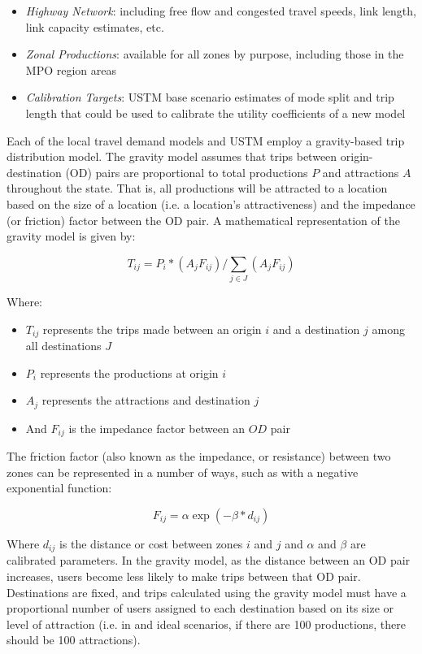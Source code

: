 \begin{itemize}
\def\labelenumi{\arabic{enumi}.}
\item
  \emph{Highway Network}: including free flow and congested travel speeds,
  link length, link capacity estimates, etc.
\item
  \emph{Zonal Productions}: available for all zones by purpose,
  including those in the MPO region areas
\item
  \emph{Calibration Targets}: USTM base scenario estimates of mode split and
  trip length that could be used to calibrate the utility coefficients of a new model
\end{itemize}

Each of the local travel demand models and USTM employ a gravity-based trip
distribution model. The gravity model assumes that trips between origin-
destination (OD) pairs are proportional to total productions $P$ and
attractions $A$ throughout the state. That is, all productions will be
attracted to a location based on the size of a location (i.e. a location's
attractiveness) and the impedance (or friction) factor between the OD
pair. A mathematical representation of the gravity model is given by:

\begin{equation}
T_{ij}= P_i*(A_j F_{ij})/\sum_{j\in J}(A_j F_{ij})
 \label{eqn:gravity}
\end{equation}

\noindent Where:
\begin{itemize}
	\item $T_{ij}$ represents the trips made between an origin $i$ and a
  destination $j$ among all destinations $J$
	\item $P_i$ represents the productions at origin $i$
	\item $A_j$ represents the attractions and destination $j$
	\item And $F_{ij}$ is the impedance factor between an $OD$ pair
\end{itemize}

The friction factor (also known as the impedance, or resistance) between two
zones can be represented in a number of ways, such as with a negative
exponential function:

\begin{equation}
	F_{ij} = \alpha \exp(-\beta * d_{ij})
  \label{eqn:fricfac}
\end{equation}

\noindent Where $d_{ij}$ is the distance or cost between zones $i$ and $j$ and $\alpha$
and $\beta$ are calibrated parameters. In the gravity model, as the distance
between an OD pair increases, users become less likely to make trips between
that OD pair. Destinations are fixed, and trips calculated using the
gravity model must have a proportional number of users assigned to each
destination based on its size or level of attraction (i.e. in and ideal
scenarios, if there are 100
productions, there should be 100 attractions).

